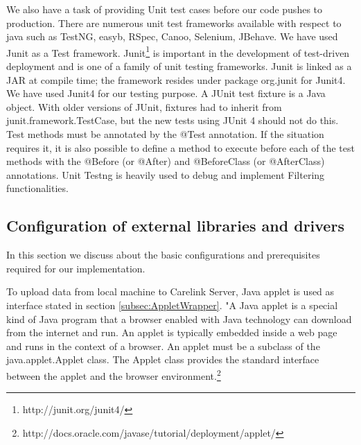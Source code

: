 \documentclass[article,type=msc,colorback,accentcolor=tud9c,twoside,11pt]{tudthesis}
\begin{document}
	We also have a task of providing Unit test cases before our code pushes to production. There are numerous unit test frameworks available with respect to java such as TestNG, easyb, RSpec, Canoo, Selenium, JBehave. We have used Junit as a Test framework. Junit\footnote{http://junit.org/junit4/} is important in the development of test-driven deployment and is one of a family of unit testing frameworks. Junit is linked as a JAR at compile time; the framework resides under package org.junit for Junit4. We have used Junit4 for our testing purpose. A JUnit test fixture is a Java object. With older versions of JUnit, fixtures had to inherit from junit.framework.TestCase, but the new tests using JUnit 4 should not do this. Test methods must be annotated by the @Test annotation. If the situation requires it, it is also possible to define a method to execute before  each of the test methods with the @Before (or @After) and @BeforeClass (or @AfterClass) annotations. Unit Testng is heavily used to debug and implement Filtering functionalities.
	\clearpage
	
	\subsection{Configuration of external libraries and drivers}
	In this section we discuss about the basic configurations and prerequisites required for our implementation.
	
	
	To upload data from local machine to Carelink Server, Java applet is  used as interface stated in section \ref{subsec:AppletWrapper}. "A Java applet is a special kind of Java program that a browser enabled with Java technology can download from the internet and run. An applet is typically embedded inside a web page and runs in the context of a browser. An applet must be a subclass of the java.applet.Applet class. The Applet class provides the standard interface between the applet and the browser environment.\footnote{http://docs.oracle.com/javase/tutorial/deployment/applet/}
	
\end{document}
